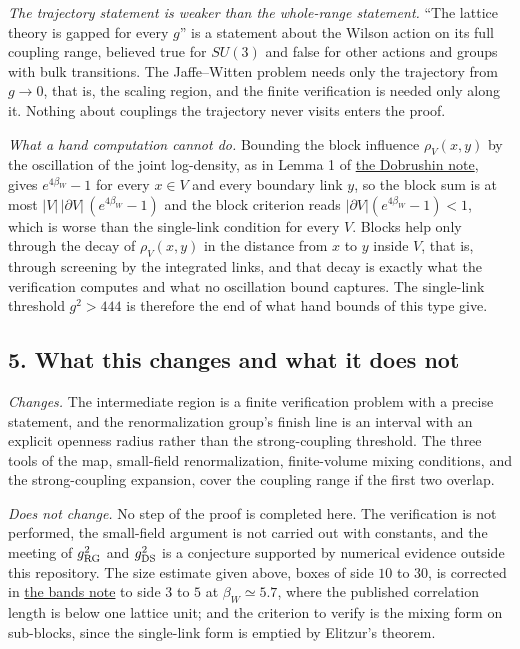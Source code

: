\documentclass[11pt,a4paper]{article}
\begin{document}
\emph{The trajectory statement is weaker than the whole-range
statement.} ``The lattice theory is gapped for every \(g\)'' is a
statement about the Wilson action on its full coupling range, believed
true for \(SU(3)\) and false for other actions and groups with bulk
transitions. The Jaffe--Witten problem needs only the trajectory from
\(g\to0\), that is, the scaling region, and the finite verification is
needed only along it. Nothing about couplings the trajectory never
visits enters the proof.

\emph{What a hand computation cannot do.} Bounding the block influence
\(\rho_V(x,y)\) by the oscillation of the joint log-density, as in Lemma
1 of \href{dobrushin-uniqueness-wilson.md}{the Dobrushin note}, gives
\(e^{4\beta_W}-1\) for every \(x\in V\) and every boundary link \(y\),
so the block sum is at most \(|V|\,|\partial V|\,(e^{4\beta_W}-1)\) and
the block criterion reads \(|\partial V|(e^{4\beta_W}-1)<1\), which is
worse than the single-link condition for every \(V\). Blocks help only
through the decay of \(\rho_V(x,y)\) in the distance from \(x\) to \(y\)
inside \(V\), that is, through screening by the integrated links, and
that decay is exactly what the verification computes and what no
oscillation bound captures. The single-link threshold \(g^2>444\) is
therefore the end of what hand bounds of this type give.

\subsection{5. What this changes and what it does
not}\label{what-this-changes-and-what-it-does-not}

\emph{Changes.} The intermediate region is a finite verification problem
with a precise statement, and the renormalization group's finish line is
an interval with an explicit openness radius rather than the
strong-coupling threshold. The three tools of the map, small-field
renormalization, finite-volume mixing conditions, and the
strong-coupling expansion, cover the coupling range if the first two
overlap.

\emph{Does not change.} No step of the proof is completed here. The
verification is not performed, the small-field argument is not carried
out with constants, and the meeting of \(g_{\rm RG}^2\) and
\(g_{\rm DS}^2\) is a conjecture supported by numerical evidence outside
this repository. The size estimate given above, boxes of side \(10\) to
\(30\), is corrected in \href{confinement-scale-bands.md}{the bands
note} to side \(3\) to \(5\) at \(\beta_W\simeq5.7\), where the
published correlation length is below one lattice unit; and the
criterion to verify is the mixing form on sub-blocks, since the
single-link form is emptied by Elitzur's theorem.
\end{document}
